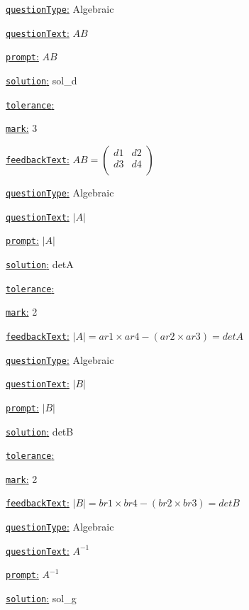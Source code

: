 \documentclass[preview]{standalone}
\newcommand \fieldname[1]{\underline{\texttt{#1}:}}
\begin{document}
\fieldname{questionType}
Algebraic

\fieldname{questionText}
$AB$

\fieldname{prompt}
$AB$

\fieldname{solution}
sol_d

\fieldname{tolerance}


\fieldname{mark}
3

\fieldname{feedbackText}
$AB = \left( {\begin{array}{cc}
   {d1} & {d2} \\
   {d3} & {d4} \\
 \end{array} } \right) $

\fieldname{questionType}
Algebraic

\fieldname{questionText}
$|A|$

\fieldname{prompt}
$|A|$

\fieldname{solution}
detA

\fieldname{tolerance}


\fieldname{mark}
2

\fieldname{feedbackText}
$|A| = {ar1} \times {ar4} - ({ar2} \times {ar3}) = {detA}$

\fieldname{questionType}
Algebraic

\fieldname{questionText}
$|B|$

\fieldname{prompt}
$|B|$

\fieldname{solution}
detB

\fieldname{tolerance}


\fieldname{mark}
2

\fieldname{feedbackText}
$|B| = {br1} \times {br4} - ({br2} \times {br3}) = {detB}$

\fieldname{questionType}
Algebraic

\fieldname{questionText}
$A^{-1}$

\fieldname{prompt}
$A^{-1}$

\fieldname{solution}
sol_g
\end{document}
